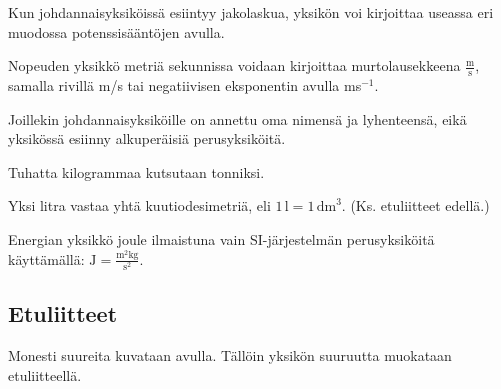 Kun johdannaisyksiköissä esiintyy jakolaskua, yksikön voi kirjoittaa useassa eri muodossa potenssisääntöjen avulla.

\begin{esimerkki}

Nopeuden yksikkö metriä sekunnissa voidaan kirjoittaa murtolausekkeena $\frac{\text{m}}{\text{s}}$, samalla rivillä m/s tai negatiivisen eksponentin avulla ms$^{-1}$.

\end{esimerkki}

Joillekin johdannaisyksiköille on annettu oma nimensä ja lyhenteensä, eikä yksikössä esiinny alkuperäisiä perusyksiköitä. 

\begin{esimerkki}

Tuhatta kilogrammaa kutsutaan tonniksi.

Yksi litra vastaa yhtä kuutiodesimetriä, eli $1\,\text{l}=1\,\text{dm}^3$. (Ks. etuliitteet edellä.)

Energian yksikkö joule ilmaistuna vain SI-järjestelmän perusyksiköitä käyttämällä: $\text{J}=\frac{\text{m}^2\text{kg}}{\text{s}^2}$.

\end{esimerkki}

\subsection*{Etuliitteet}

Monesti suureita kuvataan  avulla. Tällöin yksikön suuruutta muokataan etuliitteellä.


